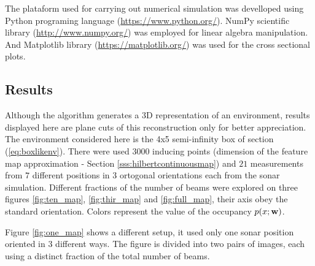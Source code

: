 The plataform used for carrying out numerical simulation was develloped using
Python programing language (\url{https://www.python.org/}). NumPy
scientific library (\url{http://www.numpy.org/}) was employed for
linear algebra manipulation. And Matplotlib
library (\url{https://matplotlib.org/}) was used for the cross sectional plots.


\subsection{Results}

Although the algorithm generates a 3D representation of an environment, results
displayed here are plane cuts of this reconstruction only for better
appreciation. The environment considered here is the 4x5 semi-infinity box of
section (\ref{eq:boxlikenv}). There were used $3000$ inducing points (dimension of
the feature map approximation - Section \ref{sss:hilbertcontinuousmap}) and $21$
measurements from $7$ different positions in $3$ ortogonal orientations each
from the sonar simulation. Different fractions of the number of beams were
explored on three figures \ref{fig:ten_map}, \ref{fig:thir_map} and
\ref{fig:full_map}, their axis obey the standard orientation. Colors represent
the value of the occupancy $p(x;\mathrm{\mathbf{w}})$.

Figure \ref{fig:one_map} shows a different setup, it used only one sonar
position oriented in $3$ different ways. The figure is divided into two pairs of
images, each using a distinct fraction of the total number of beams.


